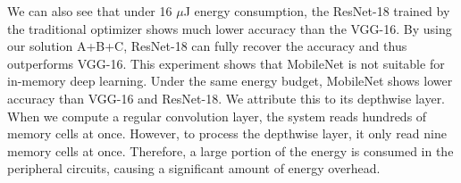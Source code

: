\documentclass[10pt,journal,compsoc]{IEEEtran}
\begin{document}
We can also see that under 16 $\mu$J energy consumption, the ResNet-18 trained by the traditional optimizer shows much lower accuracy than the VGG-16. By using our solution A+B+C, ResNet-18 can fully recover the accuracy and thus outperforms VGG-16. This experiment shows that MobileNet is not suitable for in-memory deep learning. Under the same energy budget, MobileNet shows lower accuracy than VGG-16 and ResNet-18. We attribute this to its depthwise layer. When we compute a regular convolution layer, the system reads hundreds of memory cells at once. However, to process the depthwise layer, it only read nine memory cells at once. Therefore, a large portion of the energy is consumed in the peripheral circuits, causing a significant amount of energy overhead.

\setlength{\tabcolsep}{4pt}

\renewcommand{\arraystretch}{1.26}
\end{document}
